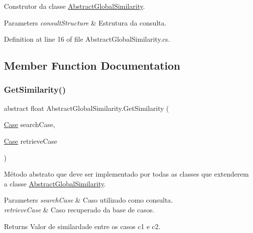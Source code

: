 Construtor da classe \hyperlink{class_abstract_global_similarity}{Abstract\+Global\+Similarity}. 


\begin{DoxyParams}{Parameters}
{\em consult\+Structure} & Estrutura da consulta.\\
\hline
\end{DoxyParams}


Definition at line 16 of file Abstract\+Global\+Similarity.\+cs.



\subsection{Member Function Documentation}
\hypertarget{class_abstract_global_similarity_a4b97677ae2f5a0bdee41019b40b45114}{}\label{class_abstract_global_similarity_a4b97677ae2f5a0bdee41019b40b45114} 
\subsubsection{\texorpdfstring{Get\+Similarity()}{GetSimilarity()}}
{\footnotesize\ttfamily abstract float Abstract\+Global\+Similarity.\+Get\+Similarity (\begin{DoxyParamCaption}\item[{\hyperlink{class_case}{Case}}]{search\+Case,  }\item[{\hyperlink{class_case}{Case}}]{retrieve\+Case }\end{DoxyParamCaption})\hspace{0.3cm}{\ttfamily [pure virtual]}}



Método abstrato que deve ser implementado por todas as classes que extenderem a classe \hyperlink{class_abstract_global_similarity}{Abstract\+Global\+Similarity}. 


\begin{DoxyParams}{Parameters}
{\em search\+Case} & Caso utilizado como consulta.\\
\hline
{\em retrieve\+Case} & Caso recuperado da base de casos.\\
\hline
\end{DoxyParams}
\begin{DoxyReturn}{Returns}
Valor de similardade entre os casos c1 e c2.
\end{DoxyReturn}


